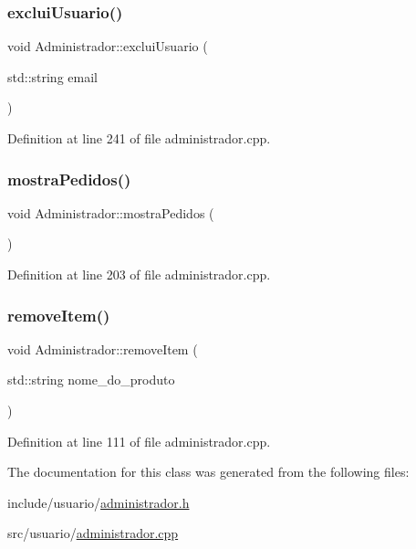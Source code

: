 \mbox{\label{class_administrador_a066e1af058776437c43a98dabb44f02b}} 
\subsubsection{\texorpdfstring{exclui\+Usuario()}{excluiUsuario()}}
{\footnotesize\ttfamily void Administrador\+::exclui\+Usuario (\begin{DoxyParamCaption}\item[{std\+::string}]{email }\end{DoxyParamCaption})}



Definition at line 241 of file administrador.\+cpp.

\mbox{\label{class_administrador_ac3d67279a170b9d7a56c1a8e8d6d8220}} 
\subsubsection{\texorpdfstring{mostra\+Pedidos()}{mostraPedidos()}}
{\footnotesize\ttfamily void Administrador\+::mostra\+Pedidos (\begin{DoxyParamCaption}{ }\end{DoxyParamCaption})}



Definition at line 203 of file administrador.\+cpp.

\mbox{\label{class_administrador_ac3032625947549cda5dd58fa7a8a1544}} 
\subsubsection{\texorpdfstring{remove\+Item()}{removeItem()}}
{\footnotesize\ttfamily void Administrador\+::remove\+Item (\begin{DoxyParamCaption}\item[{std\+::string}]{nome\+\_\+do\+\_\+produto }\end{DoxyParamCaption})}



Definition at line 111 of file administrador.\+cpp.



The documentation for this class was generated from the following files\+:\begin{DoxyCompactItemize}
\item 
include/usuario/\hyperlink{administrador_8h}{administrador.\+h}\item 
src/usuario/\hyperlink{administrador_8cpp}{administrador.\+cpp}\end{DoxyCompactItemize}
